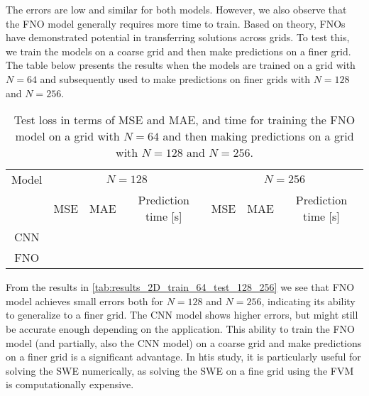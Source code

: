 The errors are low and similar for both models.
However, we also observe that the FNO model generally requires more time to train.
Based on theory, FNOs have demonstrated potential in transferring solutions across grids.
To test this, we train the models on a coarse grid and then make predictions on a finer grid.
The table below presents the results when the models are trained on a grid with $N = 64$ and subsequently used to make predictions on finer grids with $N = 128$ and $N = 256$.
\begin{table}[H]
    \centering
    \begin{tabular}{c|ccc|ccc}
        Model & \multicolumn{3}{c}{$N = 128$} & \multicolumn{3}{c}{$N = 256$} \\
        \cline{2-7}
        & MSE & MAE & Prediction time [s] & MSE & MAE & Prediction time [s] \\
        \hline
        CNN &
         &
         &
         &
         &
         &
         \\ \hline
        FNO  &
         &
         &
         &
         &
         &
         \\
    \end{tabular}
    \caption{Test loss in terms of MSE and MAE, and time for training the FNO model on a grid with $N = 64$ and then making predictions on a grid with $N = 128$ and $N=256$.}\label{tab:results_2D_train_64_test_128_256}
\end{table}
From the results in \autoref{tab:results_2D_train_64_test_128_256} we see that FNO model achieves small errors both for $N = 128$ and $N = 256$, indicating its ability to generalize to a finer grid.
The CNN model shows higher errors, but might still be accurate enough depending on the application.
This ability to train the FNO model (and partially, also the CNN model) on a coarse grid and make predictions on a finer grid is a significant advantage.
In htis study, it is particularly useful for solving the SWE numerically, as solving the SWE on a fine grid using the FVM is computationally expensive.

